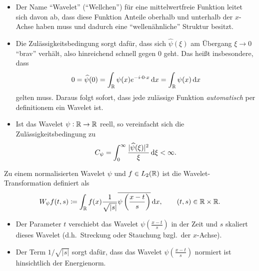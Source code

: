 \begin{remark} \leavevmode
\begin{itemize}
\item Der Name \enquote{Wavelet} (\enquote{Wellchen}) für eine mittelwertfreie Funktion leitet sich
  davon ab, dass diese Funktion Anteile oberhalb und unterhalb der $ x $-Achse haben muss und 
  dadurch eine \enquote{wellenähnliche} Struktur besitzt.
\item Die Zulässigkeitsbedingung sorgt dafür, dass sich $ \widehat{\psi}(\xi) $ am Übergang
  $ \xi \to 0 $ \enquote{brav} verhält, also hinreichend schnell gegen $ 0 $ geht. Das heißt
  insbesondere, dass
  \[
    0 = \widehat{\psi}(0) = \int_{\R} \psi(x) e^{-i \cdot 0 \cdot x} \dif x = \int_{\R} \psi(x) 
    \dif x
  \]
  gelten muss. Daraus folgt sofort, dass jede zulässige Funktion \emph{automatisch} per definitionem
  ein Wavelet ist.
\item Ist das Wavelet $ \psi : \mathbb{R} \rightarrow \mathbb{R} $ reell, so vereinfacht sich die 
  Zulässigkeitsbedingung zu
  \[
    C_{\psi} = \int_{0}^{\infty} \frac{|\widehat{\psi}(\xi)|^{2}}{\xi} \dif \xi < \infty.
  \]
\end{itemize}
\end{remark}

\begin{definition}
Zu einem normalisierten Wavelet $ \psi $ und $ f \in L_{2}(\mathbb{R}) $ ist die Wavelet-Transformation
definiert als
\[
  W_{\psi}f(t, s) \coloneqq
  \int_{\R} f(x) \frac{1}{\sqrt{|s|}} \overline{\psi\left(\frac{x - t}{s}\right)} \dif x, \qquad
    (t,s) \in \R \times \R.
\]
\end{definition}

\begin{remark} \leavevmode
\begin{itemize}
\item Der Parameter $ t $ verschiebt das Wavelet $ \psi\left(\frac{x - t}{s}\right) $ in der Zeit
  und $ s $ skaliert dieses Wavelet (d.h.\ Streckung oder Stauchung bzgl.\ der $ x $-Achse).
\item Der Term $ 1 / \sqrt{|s|} $ sorgt dafür, dass das Wavelet $ \psi\left(\frac{x - t}{s}\right) $
  normiert ist hinsichtlich der Energienorm.
\end{itemize}
\end{remark}

